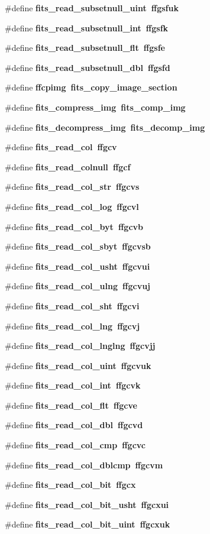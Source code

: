 \begin{CompactItemize}
\#define \bf{fits\_\-read\_\-subsetnull\_\-uint}~ffgsfuk
\item 
\#define \bf{fits\_\-read\_\-subsetnull\_\-int}~ffgsfk
\item 
\#define \bf{fits\_\-read\_\-subsetnull\_\-flt}~ffgsfe
\item 
\#define \bf{fits\_\-read\_\-subsetnull\_\-dbl}~ffgsfd
\item 
\#define \bf{ffcpimg}~fits\_\-copy\_\-image\_\-section
\item 
\#define \bf{fits\_\-compress\_\-img}~fits\_\-comp\_\-img
\item 
\#define \bf{fits\_\-decompress\_\-img}~fits\_\-decomp\_\-img
\item 
\#define \bf{fits\_\-read\_\-col}~ffgcv
\item 
\#define \bf{fits\_\-read\_\-colnull}~ffgcf
\item 
\#define \bf{fits\_\-read\_\-col\_\-str}~ffgcvs
\item 
\#define \bf{fits\_\-read\_\-col\_\-log}~ffgcvl
\item 
\#define \bf{fits\_\-read\_\-col\_\-byt}~ffgcvb
\item 
\#define \bf{fits\_\-read\_\-col\_\-sbyt}~ffgcvsb
\item 
\#define \bf{fits\_\-read\_\-col\_\-usht}~ffgcvui
\item 
\#define \bf{fits\_\-read\_\-col\_\-ulng}~ffgcvuj
\item 
\#define \bf{fits\_\-read\_\-col\_\-sht}~ffgcvi
\item 
\#define \bf{fits\_\-read\_\-col\_\-lng}~ffgcvj
\item 
\#define \bf{fits\_\-read\_\-col\_\-lnglng}~ffgcvjj
\item 
\#define \bf{fits\_\-read\_\-col\_\-uint}~ffgcvuk
\item 
\#define \bf{fits\_\-read\_\-col\_\-int}~ffgcvk
\item 
\#define \bf{fits\_\-read\_\-col\_\-flt}~ffgcve
\item 
\#define \bf{fits\_\-read\_\-col\_\-dbl}~ffgcvd
\item 
\#define \bf{fits\_\-read\_\-col\_\-cmp}~ffgcvc
\item 
\#define \bf{fits\_\-read\_\-col\_\-dblcmp}~ffgcvm
\item 
\#define \bf{fits\_\-read\_\-col\_\-bit}~ffgcx
\item 
\#define \bf{fits\_\-read\_\-col\_\-bit\_\-usht}~ffgcxui
\item 
\#define \bf{fits\_\-read\_\-col\_\-bit\_\-uint}~ffgcxuk
\item 

\end{CompactItemize}
